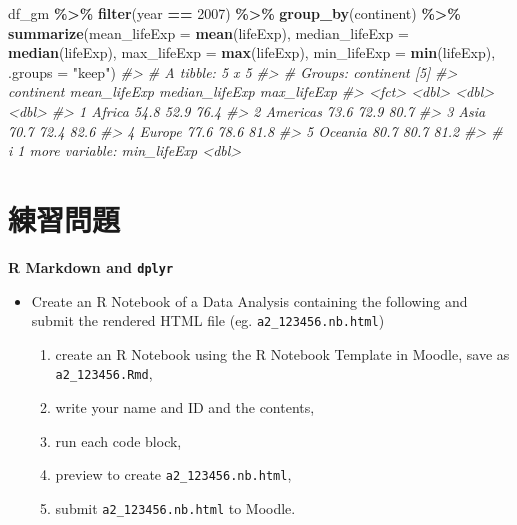 \documentclass[
  xelatex, ja=standard]{bxjsbook}
\newenvironment{Shaded}{\begin{snugshade}}{\end{snugshade}}
\newcommand{\AttributeTok}[1]{\textcolor[rgb]{0.13,0.29,0.53}{#1}}
\newcommand{\CommentTok}[1]{\textcolor[rgb]{0.56,0.35,0.01}{\textit{#1}}}
\newcommand{\DecValTok}[1]{\textcolor[rgb]{0.00,0.00,0.81}{#1}}
\newcommand{\FunctionTok}[1]{\textcolor[rgb]{0.13,0.29,0.53}{\textbf{#1}}}
\newcommand{\NormalTok}[1]{#1}
\newcommand{\SpecialCharTok}[1]{\textcolor[rgb]{0.81,0.36,0.00}{\textbf{#1}}}
\newcommand{\StringTok}[1]{\textcolor[rgb]{0.31,0.60,0.02}{#1}}
\providecommand{\tightlist}{%
  \setlength{\itemsep}{0pt}\setlength{\parskip}{0pt}}
\theoremstyle{definition}
\theoremstyle{definition}
\theoremstyle{definition}
\theoremstyle{definition}
\theoremstyle{remark}
\begin{document}
\begin{Shaded}
\begin{Highlighting}[]
\NormalTok{df\_gm }\SpecialCharTok{\%\textgreater{}\%} \FunctionTok{filter}\NormalTok{(year }\SpecialCharTok{==} \DecValTok{2007}\NormalTok{) }\SpecialCharTok{\%\textgreater{}\%} 
  \FunctionTok{group\_by}\NormalTok{(continent) }\SpecialCharTok{\%\textgreater{}\%} 
  \FunctionTok{summarize}\NormalTok{(}\AttributeTok{mean\_lifeExp =} \FunctionTok{mean}\NormalTok{(lifeExp), }\AttributeTok{median\_lifeExp =} \FunctionTok{median}\NormalTok{(lifeExp), }\AttributeTok{max\_lifeExp =} \FunctionTok{max}\NormalTok{(lifeExp), }\AttributeTok{min\_lifeExp =} \FunctionTok{min}\NormalTok{(lifeExp), }\AttributeTok{.groups =} \StringTok{"keep"}\NormalTok{)}
\CommentTok{\#\textgreater{} \# A tibble: 5 x 5}
\CommentTok{\#\textgreater{} \# Groups:   continent [5]}
\CommentTok{\#\textgreater{}   continent mean\_lifeExp median\_lifeExp max\_lifeExp}
\CommentTok{\#\textgreater{}   \textless{}fct\textgreater{}            \textless{}dbl\textgreater{}          \textless{}dbl\textgreater{}       \textless{}dbl\textgreater{}}
\CommentTok{\#\textgreater{} 1 Africa            54.8           52.9        76.4}
\CommentTok{\#\textgreater{} 2 Americas          73.6           72.9        80.7}
\CommentTok{\#\textgreater{} 3 Asia              70.7           72.4        82.6}
\CommentTok{\#\textgreater{} 4 Europe            77.6           78.6        81.8}
\CommentTok{\#\textgreater{} 5 Oceania           80.7           80.7        81.2}
\CommentTok{\#\textgreater{} \# i 1 more variable: min\_lifeExp \textless{}dbl\textgreater{}}
\end{Highlighting}
\end{Shaded}

\hypertarget{ux7df4ux7fd2ux554fux984c}{%
\section{練習問題}\label{ux7df4ux7fd2ux554fux984c}}

\textbf{R Markdown and \texttt{dplyr}}

\begin{itemize}
\tightlist
\item
  Create an R Notebook of a Data Analysis containing the following and submit the rendered HTML file (eg. \texttt{a2\_123456.nb.html})

  \begin{enumerate}
  \def\labelenumi{\arabic{enumi}.}
  \tightlist
  \item
    create an R Notebook using the R Notebook Template in Moodle, save as \texttt{a2\_123456.Rmd},
  \item
    write your name and ID and the contents,
  \item
    run each code block,
  \item
    preview to create \texttt{a2\_123456.nb.html},
  \item
    submit \texttt{a2\_123456.nb.html} to Moodle.
  \end{enumerate}
\end{itemize}
\end{document}

